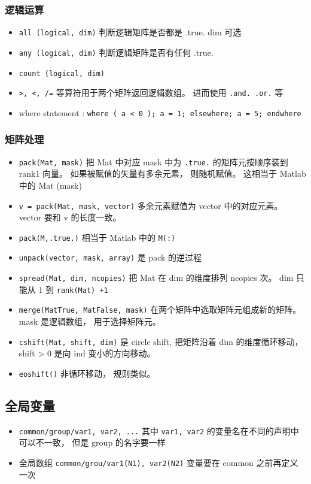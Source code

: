 \subsubsection{逻辑运算}
\begin{itemize}
\item \verb`all (logical, dim)` 判断逻辑矩阵是否都是 .true.  dim 可选
\item \verb`any (logical, dim)` 判断逻辑矩阵是否有任何 .true.
\item \verb`count (logical, dim) `
\item \verb`>, <, /=` 等算符用于两个矩阵返回逻辑数组。 进而使用 \verb`.and. .or.` 等
\item where statement : 
\verb`where ( a < 0 ); a = 1; elsewhere; a = 5; endwhere`
\end{itemize}

\subsubsection{矩阵处理}
\begin{itemize}
\item \verb`pack(Mat, mask)` 把 Mat 中对应 mask 中为 \verb|.true.| 的矩阵元按顺序装到 rank1 向量。 如果被赋值的矢量有多余元素， 则随机赋值。 这相当于 Matlab 中的 Mat (mask)
\item \verb`v = pack(Mat, mask, vector)` 多余元素赋值为 vector 中的对应元素。 vector 要和 v 的长度一致。
\item \verb`pack(M,.true.)` 相当于 Matlab 中的 \verb|M(:)|
\item \verb`unpack(vector, mask, array)` 是 pack 的逆过程
\item \verb`spread(Mat, dim, ncopies)` 把 Mat 在 dim 的维度排列 ncopies 次。 dim 只能从 1 到 \verb`rank(Mat) +1`
\item \verb`merge(MatTrue, MatFalse, mask)` 在两个矩阵中选取矩阵元组成新的矩阵。 mask 是逻辑数组， 用于选择矩阵元。
\item \verb`cshift(Mat, shift, dim)` 是 circle shift, 把矩阵沿着 dim 的维度循环移动， shift > 0 是向 ind 变小的方向移动。
\item \verb`eoshift()` 非循环移动， 规则类似。
\end{itemize}

\subsection{全局变量}
\begin{itemize}
\item \verb`common/group/var1, var2, ...` 其中 \verb|var1, var2| 的变量名在不同的声明中可以不一致， 但是 group 的名字要一样
\item 全局数组 \verb`common/grou/var1(N1), var2(N2)` 变量要在 common 之前再定义一次
\end{itemize}

